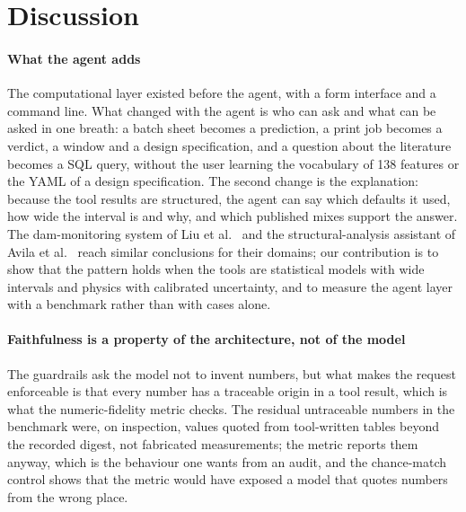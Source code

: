 \documentclass[preprint,12pt]{elsarticle}
\begin{document}
\section{Discussion}\label{sec:discussion}

\paragraph{What the agent adds} The computational layer existed before the agent, with a form interface and a command line. What changed with the agent is who can ask and what can be asked in one breath: a batch sheet becomes a prediction, a print job becomes a verdict, a window and a design specification, and a question about the literature becomes a SQL query, without the user learning the vocabulary of 138 features or the YAML of a design specification. The second change is the explanation: because the tool results are structured, the agent can say which defaults it used, how wide the interval is and why, and which published mixes support the answer. The dam-monitoring system of Liu et al.\ \cite{liu2026llm4shm} and the structural-analysis assistant of Avila et al.\ \cite{avila2025hai} reach similar conclusions for their domains; our contribution is to show that the pattern holds when the tools are statistical models with wide intervals and physics with calibrated uncertainty, and to measure the agent layer with a benchmark rather than with cases alone.

\paragraph{Faithfulness is a property of the architecture, not of the model} The guardrails ask the model not to invent numbers, but what makes the request enforceable is that every number has a traceable origin in a tool result, which is what the numeric-fidelity metric checks. The residual untraceable numbers in the benchmark were, on inspection, values quoted from tool-written tables beyond the recorded digest, not fabricated measurements; the metric reports them anyway, which is the behaviour one wants from an audit, and the chance-match control shows that the metric would have exposed a model that quotes numbers from the wrong place.
\end{document}
